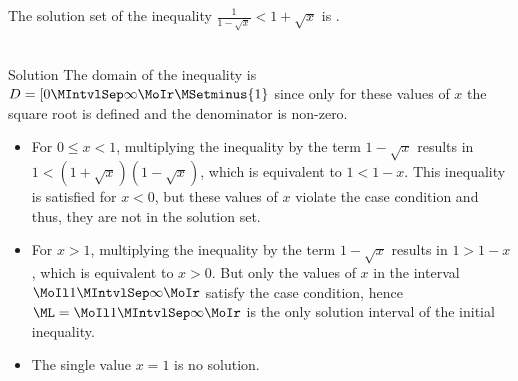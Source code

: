\begin{MExercises}
\begin{MExercise}
The solution set of the inequality $\frac1{1-\sqrt{x}}<1+\sqrt{x}$ is .
\ \\ \ \\
\begin{MHint}{Solution}
The domain of the inequality is $D=[0\MIntvlSep \infty\MoIr\MSetminus \lbrace 1\rbrace$
since only for these values of $x$ the square root is defined and the denominator is non-zero.
\begin{itemize}
\item{For $0\leq x<1$, multiplying the inequality by the term $1-\sqrt{x}$ results in
  $1<(1+\sqrt{x})(1-\sqrt{x})$, which is equivalent to $1<1-x$. This 
inequality is satisfied for $x<0$, but these values of $x$ violate the case condition and 
thus, they are not in the solution set.}
\item{For $x>1$, multiplying the inequality by the term $1-\sqrt{x}$ results in $1>1-x$, 
which is equivalent to $x>0$. But only the values of $x$ in the interval
  $\MoIl 1\MIntvlSep \infty\MoIr$ satisfy the case condition, hence $\ML=\MoIl 1\MIntvlSep \infty\MoIr$ 
is the only solution interval of the initial inequality.}
\item{The single value $x=1$ is no solution.}
\end{itemize}
\end{MHint}
\end{MExercise}


\end{MExercises}


